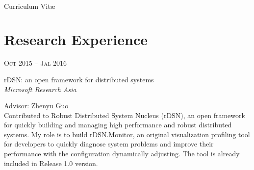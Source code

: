 \documentclass[10pt]{article} %
\begin{document}
\color{text1} %


\par{\\ %
{\color{headings} Curriculum {Vit\ae}\\[15pt]\par} %
	

\begin{minipage}[t]{0.5\textwidth} %
\vspace{0pt} %
	

\section{Research Experience} 


{\raggedleft\textsc{Oct 2015 -- Jal 2016}\par}

{\raggedright\large rDSN:  an open framework for distributed systems\\
\textit{{\color{stress}Microsoft Research} Asia }\\[5pt]
}

Advisor: Zhenyu Guo\\
\normalsize{Contributed to Robust Distributed System Nucleus (rDSN), an open framework for quickly building and managing high performance and robust distributed systems.  My role is to build rDSN.Monitor, an original visualization profiling tool for developers to quickly diagnose system problems and improve their performance with the configuration dynamically adjusting. The tool is already included in Release 1.0 version.}\\




\end{minipage}}
\end{document}
